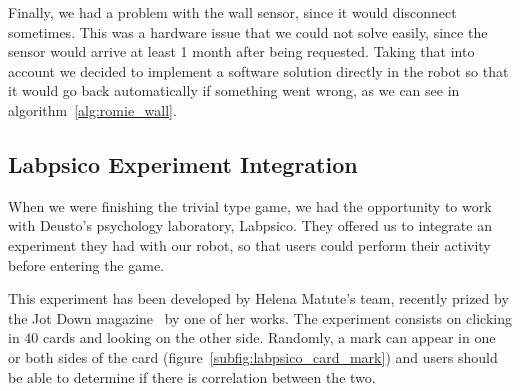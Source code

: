 Finally, we had a problem with the wall sensor, since it would disconnect sometimes. This was a
hardware issue that we could not solve easily, since the sensor would arrive at least 1 month after
being requested. Taking that into account we decided to implement a software solution directly in
the robot so that it would go back automatically if something went wrong, as we can see in
algorithm~\ref{alg:romie_wall}.

\subsection{Labpsico Experiment Integration}

When we were finishing the trivial type game, we had the opportunity to work with Deusto's
psychology laboratory, Labpsico. They offered us to integrate an experiment they had with our robot,
so that users could perform their activity before entering the game.

This experiment has been developed by Helena Matute's team, recently prized by the Jot Down
magazine~\cite{jotdown_helena} by one of her works. The experiment consists on clicking in 40 cards
and looking on the other side. Randomly, a mark can appear in one or both sides of the card
(figure~\ref{subfig:labpsico_card_mark}) and users should be able to determine if there is
correlation
between the two.

